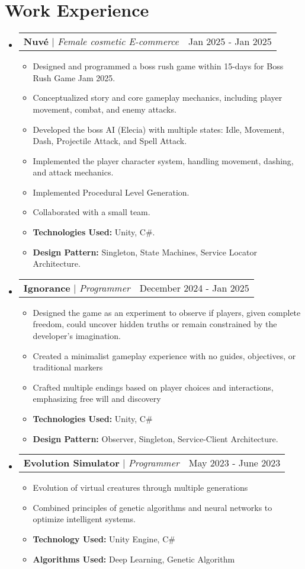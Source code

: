 \documentclass[letterpaper,11pt]{article}
\makeatletter
\newcommand{\resumeItem}[1]{
  \item\small{
    {#1 \vspace{-2pt}}
  }
}
\newcommand{\resumeProjectHeading}[2]{
    \item
    \begin{tabular*}{0.97\textwidth}{l@{\extracolsep{\fill}}r}
      \small#1 & #2 \\
    \end{tabular*}\vspace{-7pt}
}
\newcommand{\resumeSubHeadingListStart}{\begin{itemize}[leftmargin=0.15in, label={}]}
\newcommand{\resumeSubHeadingListEnd}{\end{itemize}}
\newcommand{\resumeItemListStart}{\begin{itemize}}
\newcommand{\resumeItemListEnd}{\end{itemize}\vspace{-5pt}}
\makeatother
\begin{document}
\section{Work Experience}
    \resumeSubHeadingListStart
    \resumeProjectHeading
          {\textbf{Nuvé} $|$ \emph{Female cosmetic E-commerce}}{Jan 2025 - Jan 2025}
          \resumeItemListStart
            \resumeItem{Designed and programmed a boss rush game within 15-days for Boss Rush Game Jam 2025.}
            \resumeItem{Conceptualized story and core gameplay mechanics, including player movement, combat, and enemy attacks.}
             \resumeItem{Developed the boss AI (Elecia) with multiple states: Idle, Movement, Dash, Projectile Attack, and Spell Attack.}
             \resumeItem{Implemented the player character system, handling movement, dashing, and attack mechanics.}
            \resumeItem{Implemented Procedural Level Generation.}
            \resumeItem{Collaborated with a small team.}
            \resumeItem{\textbf{Technologies Used:} Unity, C\#.}
            \resumeItem{\textbf{Design Pattern:} Singleton, State Machines, Service Locator Architecture.}
            \resumeItemListEnd
    \resumeProjectHeading
          {\textbf{Ignorance} $|$ \emph{Programmer}}{December 2024 - Jan 2025}
          \resumeItemListStart
            \resumeItem{Designed the game as an experiment to observe if players, given complete freedom, could uncover hidden truths or remain constrained by the developer’s imagination.}
             \resumeItem{Created a minimalist gameplay experience with no guides, objectives, or traditional markers}
             \resumeItem{Crafted multiple endings based on player choices and interactions, emphasizing free will and discovery}
             \resumeItem{\textbf{Technologies Used:} Unity, C\#}
             \resumeItem{\textbf{Design Pattern:} Observer, Singleton, Service-Client Architecture.}
            \resumeItemListEnd
      \resumeProjectHeading
          {\textbf{Evolution Simulator } $|$ \emph{Programmer}}{May 2023 - June 2023}
          \resumeItemListStart
            \resumeItem{Evolution of virtual creatures through multiple generations}
            \resumeItem{Combined principles of genetic algorithms and neural networks to optimize intelligent systems.}
            \resumeItem{\textbf{Technology Used:} Unity Engine, C\#}
            \resumeItem{\textbf{Algorithms Used:} Deep Learning, Genetic Algorithm}
            \resumeItemListEnd
      \resumeSubHeadingListEnd
\end{document}
